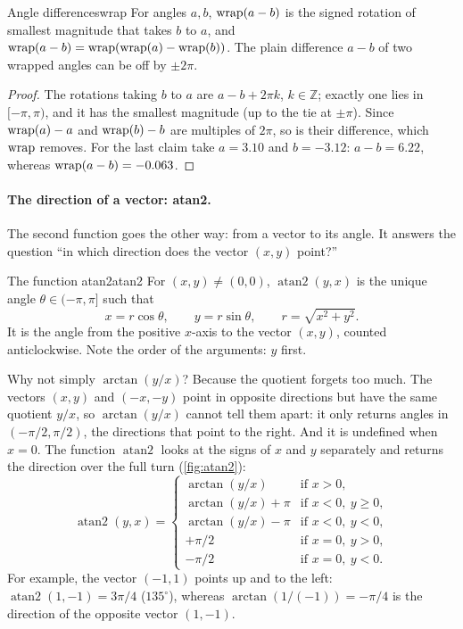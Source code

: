 \begin{lemma}{Angle differences}{wrap}
For angles $a,b$, $\operatorname{wrap}(a-b)$ is the signed rotation of smallest
magnitude that takes $b$ to $a$, and $\operatorname{wrap}(a-b)=\operatorname{wrap}(\operatorname{wrap}(a)-\operatorname{wrap}(b))$.
The plain difference $a-b$ of two wrapped angles can be off by $\pm2\pi$.
\end{lemma}

\begin{proof}
The rotations taking $b$ to $a$ are $a-b+2\pi k$, $k\in\mathbb{Z}$; exactly
one lies in $[-\pi,\pi)$, and it has the smallest magnitude (up to the tie
at $\pm\pi$). Since $\operatorname{wrap}(a)-a$ and $\operatorname{wrap}(b)-b$ are multiples of $2\pi$,
so is their difference, which $\operatorname{wrap}$ removes. For the last claim take
$a=3.10$ and $b=-3.12$: $a-b=6.22$, whereas $\operatorname{wrap}(a-b)=-0.063$.
\end{proof}

\paragraph{The direction of a vector: atan2.} The second function goes the
other way: from a vector to its angle. It answers the question ``in which
direction does the vector $(x,y)$ point?''

\begin{definition}{The function atan2}{atan2}
For $(x,y)\neq(0,0)$, $\operatorname{atan2}(y,x)$ is the unique angle
$\theta\in(-\pi,\pi]$ such that
\[
  x=r\cos\theta,\qquad y=r\sin\theta,\qquad r=\sqrt{x^2+y^2}.
\]
It is the angle from the positive $x$-axis to the vector $(x,y)$, counted
anticlockwise. Note the order of the arguments: $y$ first.
\end{definition}

Why not simply $\arctan(y/x)$? Because the quotient forgets too much. The
vectors $(x,y)$ and $(-x,-y)$ point in opposite directions but have the
same quotient $y/x$, so $\arctan(y/x)$ cannot tell them apart: it only
returns angles in $(-\pi/2,\pi/2)$, the directions that point to the
right. And it is undefined when $x=0$. The function $\operatorname{atan2}$
looks at the signs of $x$ and $y$ separately and returns the direction
over the full turn (\cref{fig:atan2}):
\[
  \operatorname{atan2}(y,x)=
  \begin{cases}
    \arctan(y/x) & \text{if } x>0,\\
    \arctan(y/x)+\pi & \text{if } x<0,\ y\ge0,\\
    \arctan(y/x)-\pi & \text{if } x<0,\ y<0,\\
    +\pi/2 & \text{if } x=0,\ y>0,\\
    -\pi/2 & \text{if } x=0,\ y<0.
  \end{cases}
\]
For example, the vector $(-1,1)$ points up and to the left:
$\operatorname{atan2}(1,-1)=3\pi/4$ ($135^\circ$), whereas
$\arctan(1/(-1))=-\pi/4$ is the direction of the opposite vector $(1,-1)$.

